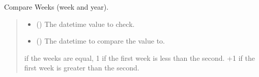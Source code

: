 \documentclass[letterpaper,10pt,english]{sphinxmanual}
\begin{document}
\begin{fulllineitems}
\begin{fulllineitems}
\begin{quote}
\begin{description}
\end{description}\end{quote}

\end{fulllineitems}


\begin{fulllineitems}
\label{\detokenize{apache_commons_validator_python.routines:apache_commons_validator_python.routines.calendar_validator.CalendarValidator.compare_weeks}}
\pysigstartsignatures
{}
\pysigstopsignatures
\sphinxAtStartPar
Compare Weeks (week and year).
\begin{quote}\begin{description}
\begin{itemize}
\item {} 
\sphinxAtStartPar
{} () \textendash{} The datetime value to check.

\item {} 
\sphinxAtStartPar
{} () \textendash{} The datetime to compare the value to.

\end{itemize}

 if the weeks are equal,
\sphinxhyphen{}1 if the first week is less than the second.
+1 if the first week is greater than the second.

\end{description}\end{quote}

\end{fulllineitems}



\end{fulllineitems}
\end{document}
